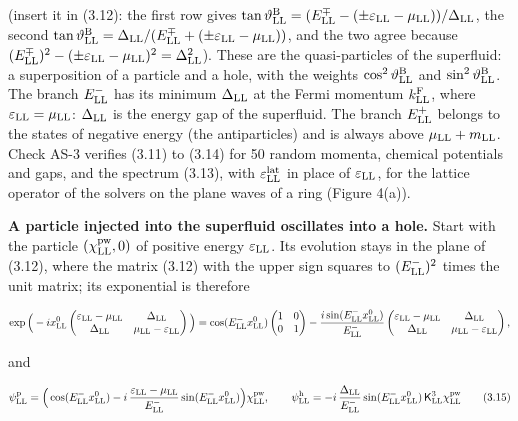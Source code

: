 \documentclass[
  10pt,
]{article}
\begin{document}
(insert it in (3.12): the first row gives
\(\tan\vartheta^{\rm B}_{\rm LL}=(E^\mp_{\rm LL}-(\pm\varepsilon_{\rm LL}-\mu_{\rm LL}))/\Delta_{\rm LL}\),
the second
\(\tan\vartheta^{\rm B}_{\rm LL}=\Delta_{\rm LL}/(E^\mp_{\rm LL}+(\pm\varepsilon_{\rm LL}-\mu_{\rm LL}))\),
and the two agree because
\((E^\mp_{\rm LL})^2-(\pm\varepsilon_{\rm LL}-\mu_{\rm LL})^2=\Delta_{\rm LL}^2\)).
These are the quasi-particles of the superfluid: a superposition of a
particle and a hole, with the weights
\(\cos^2\vartheta^{\rm B}_{\rm LL}\) and
\(\sin^2\vartheta^{\rm B}_{\rm LL}\). The branch \(E^-_{\rm LL}\) has
its minimum \(\Delta_{\rm LL}\) at the Fermi momentum
\(k^{\rm F}_{\rm LL}\), where \(\varepsilon_{\rm LL}=\mu_{\rm LL}\):
\(\Delta_{\rm LL}\) is the energy gap of the superfluid. The branch
\(E^+_{\rm LL}\) belongs to the states of negative energy (the
antiparticles) and is always above \(\mu_{\rm LL}+m_{\rm LL}\). Check
AS-3 verifies (3.11) to (3.14) for 50 random momenta, chemical
potentials and gaps, and the spectrum (3.13), with
\(\varepsilon^{\rm lat}_{\rm LL}\) in place of \(\varepsilon_{\rm LL}\),
for the lattice operator of the solvers on the plane waves of a ring
(Figure 4(a)).

\textbf{A particle injected into the superfluid oscillates into a hole.}
Start with the particle \((\chi^{\rm pw}_{\rm LL},0)\) of positive
energy \(\varepsilon_{\rm LL}\). Its evolution stays in the plane of
(3.12), where the matrix (3.12) with the upper sign squares to
\((E^-_{\rm LL})^2\) times the unit matrix; its exponential is therefore

\[\exp\Big(-ix^0_{\rm LL}\begin{pmatrix}\varepsilon_{\rm LL}-\mu_{\rm LL}&\Delta_{\rm LL}\\\Delta_{\rm LL}&\mu_{\rm LL}-\varepsilon_{\rm LL}\end{pmatrix}\Big)=\cos(E^-_{\rm LL}x^0_{\rm LL})\begin{pmatrix}1&0\\0&1\end{pmatrix}-\frac{i\sin(E^-_{\rm LL}x^0_{\rm LL})}{E^-_{\rm LL}}\begin{pmatrix}\varepsilon_{\rm LL}-\mu_{\rm LL}&\Delta_{\rm LL}\\\Delta_{\rm LL}&\mu_{\rm LL}-\varepsilon_{\rm LL}\end{pmatrix},\]

and

\[\psi^{\rm p}_{\rm LL}=\Big(\cos(E^-_{\rm LL}x^0_{\rm LL})-i\,\frac{\varepsilon_{\rm LL}-\mu_{\rm LL}}{E^-_{\rm LL}}\sin(E^-_{\rm LL}x^0_{\rm LL})\Big)\chi^{\rm pw}_{\rm LL},\qquad\psi^{\rm h}_{\rm LL}=-i\,\frac{\Delta_{\rm LL}}{E^-_{\rm LL}}\sin(E^-_{\rm LL}x^0_{\rm LL})\,\mathsf K^3_{\rm LL}\chi^{\rm pw}_{\rm LL}\tag{3.15}\]
\end{document}
